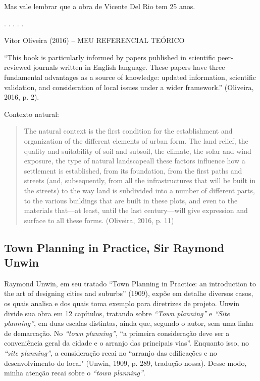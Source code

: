 \documentclass[12pt, a4paper]{book} %
\begin{document}
        Mas vale lembrar que a obra de Vicente Del Rio tem 25 anos.
        \begin{center}
            . . . . .
        \end{center} 



        
        Vitor Oliveira (2016) – MEU REFERENCIAL TEÓRICO

        ``This book is particularly informed by papers published in scientific peer-reviewed journals written in English language. These papers have three fundamental advantages as a source of knowledge: updated information, scientific validation, and consideration of local issues under a wider framework.'' (Oliveira, 2016, p. 2).

        Contexto natural: 
        
        \begin{quotation}
            The natural context is the first condition for the establishment and organization of the different elements of urban form. The land relief, the quality and suitability of soil and subsoil, the climate, the solar and wind exposure, the type of natural landscapeall these factors influence how a settlement is established, from its foundation, from the first paths and streets (and, subsequently, from all the infrastructures that will be built in the streets) to the way land is subdivided into a number of different parts, to the various buildings that are built in these plots, and even to the materials that—at least, until the last century—will give expression and surface to all these forms. (Oliveira, 2016, p. 11)
        \end{quotation}


                \subsection{Town Planning in Practice, Sir Raymond Unwin}
        
        Raymond Unwin, em seu tratado ``Town Planning in Practice: an introduction to the art of designing cities and suburbs'' (1909), expõe em detalhe diversos casos, os quais analisa e dos quais toma exemplo para diretrizes de projeto. Unwin divide sua obra em 12 capítulos, tratando sobre \textit{``Town planning''} e \textit{``Site planning''}, em duas escalas distintas, ainda que, segundo o autor, sem uma linha de demarcação. No \textit{``town planning''}, ``a primeira consideração deve ser a conveniência geral da cidade e o arranjo das principais vias''. Enquanto isso, no \textit{``site planning''}, a consideração recai no ``arranjo das edificações e no desenvolvimento do local" (Unwin, 1909, p. 289, tradução nossa). Desse modo, minha atenção recai sobre o \textit{``town planning''}.
\end{document}
